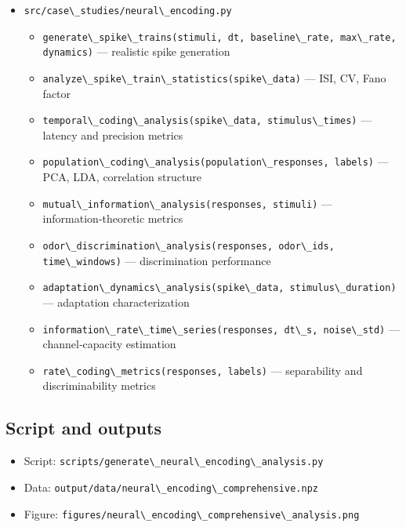 \documentclass[
  13pt,
  a4paperpaper,
  12pt]{article}
\newcommand{\passthrough}[1]{#1}
\providecommand{\tightlist}{%
  \setlength{\itemsep}{0pt}\setlength{\parskip}{0pt}}
\begin{document}
\begin{itemize}
\tightlist
\item
  \passthrough{\lstinline!src/case\_studies/neural\_encoding.py!}

  \begin{itemize}
  \tightlist
  \item
    \passthrough{\lstinline!generate\_spike\_trains(stimuli, dt, baseline\_rate, max\_rate, dynamics)!}
    --- realistic spike generation
  \item
    \passthrough{\lstinline!analyze\_spike\_train\_statistics(spike\_data)!}
    --- ISI, CV, Fano factor
  \item
    \passthrough{\lstinline!temporal\_coding\_analysis(spike\_data, stimulus\_times)!}
    --- latency and precision metrics
  \item
    \passthrough{\lstinline!population\_coding\_analysis(population\_responses, labels)!}
    --- PCA, LDA, correlation structure
  \item
    \passthrough{\lstinline!mutual\_information\_analysis(responses, stimuli)!}
    --- information‑theoretic metrics
  \item
    \passthrough{\lstinline!odor\_discrimination\_analysis(responses, odor\_ids, time\_windows)!}
    --- discrimination performance
  \item
    \passthrough{\lstinline!adaptation\_dynamics\_analysis(spike\_data, stimulus\_duration)!}
    --- adaptation characterization
  \item
    \passthrough{\lstinline!information\_rate\_time\_series(responses, dt\_s, noise\_std)!}
    --- channel‑capacity estimation
  \item
    \passthrough{\lstinline!rate\_coding\_metrics(responses, labels)!}
    --- separability and discriminability metrics
  \end{itemize}
\end{itemize}

\subsection{Script and outputs}\label{script-and-outputs-3}

\begin{itemize}
\tightlist
\item
  Script:
  \passthrough{\lstinline!scripts/generate\_neural\_encoding\_analysis.py!}
\item
  Data:
  \passthrough{\lstinline!output/data/neural\_encoding\_comprehensive.npz!}
\item
  Figure:
  \passthrough{\lstinline!figures/neural\_encoding\_comprehensive\_analysis.png!}
\end{itemize}
\end{document}
